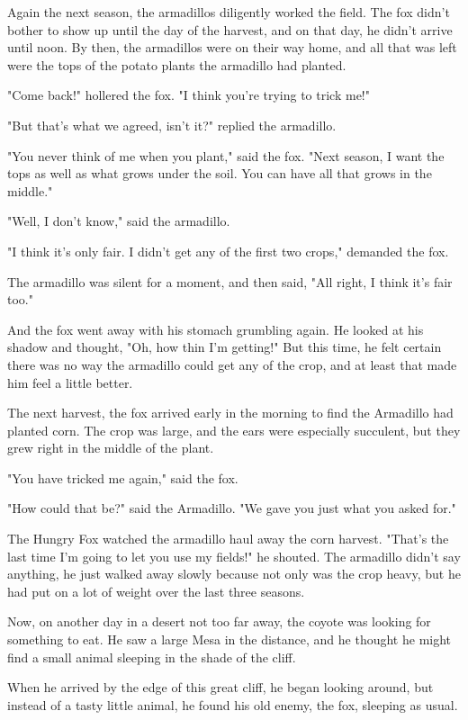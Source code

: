 Again the next season, the armadillos diligently worked the field. The fox didn't bother to show up until the day of the harvest, and on that day, he didn't arrive until noon. By then, the armadillos were on their way home, and all that was left were the tops of the potato plants the armadillo had planted.

"Come back!" hollered the fox. "I think you're trying to trick me!"

"But that's what we agreed, isn't it?" replied the armadillo.

"You never think of me when you plant," said the fox. "Next season, I want the tops as well as what grows under the soil. You can have all that grows in the middle."

"Well, I don't know," said the armadillo.

"I think it's only fair. I didn't get any of the first two crops," demanded the fox.

The armadillo was silent for a moment, and then said, "All right, I think it's fair too."

And the fox went away with his stomach grumbling again. He looked at his shadow and thought, "Oh, how thin I'm getting!" But this time, he felt certain there was no way the armadillo could get any of the crop, and at least that made him feel a little better.

The next harvest, the fox arrived early in the morning to find the Armadillo had planted corn. The crop was large, and the ears were especially succulent, but they grew right in the middle of the plant.

"You have tricked me again," said the fox.

"How could that be?" said the Armadillo. "We gave you just what you asked for."

The Hungry Fox watched the armadillo haul away the corn harvest. "That's the last time I'm going to let you use my fields!" he shouted. The armadillo didn't say anything, he just walked away slowly because not only was the crop heavy, but he had put on a lot of weight over the last three seasons.

Now, on another day in a desert not too far away, the coyote was looking for something to eat. He saw a large Mesa in the distance, and he thought he might find a small animal sleeping in the shade of the cliff.

When he arrived by the edge of this great cliff, he began looking around, but instead of a tasty little animal, he found his old enemy, the fox, sleeping as usual.

